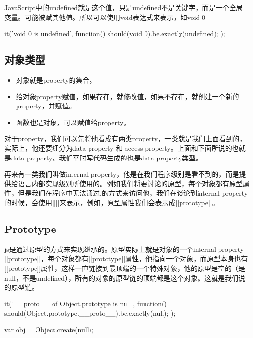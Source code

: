 JavaScript中的undefined就是这个值，只是undefined不是关键字，而是一个全局变量。可能被赋其他值。所以可以使用void表达式来表示，如void 0 
\begin{JavaScript}
		it('void 0 is undefined', function(){
			should(void 0).be.exactly(undefined);
		});
\end{JavaScript}

\subsection{对象类型}

\begin{itemize}
\item 对象就是property的集合。
\item 给对象property赋值，如果存在，就修改值，如果不存在，就创建一个新的property，并赋值。
\item 函数也是对象，可以赋值给property。
\end{itemize}
	
对于property，我们可以先将他看成有两类property，一类就是我们上面看到的，实际上，他还要细分为data property 和 access property。上面和下面所说的也就是data property。我们平时写代码生成的也是data property类型。
	
再来有一类我们叫做internal property，他是在我们程序级别是看不到的，而是提供给语言内部实现级别所使用的。例如我们将要讨论的原型，每个对象都有原型属性，但是我们在程序中无法通过.的方式来访问他，我们在谈论到internal property的时候，会使用[[]]来表示，例如，原型属性我们会表示成[[prototype]]。
	
\subsection{Prototype}
	
js是通过原型的方式来实现继承的。原型实际上就是对象的一个internal property [[prototype]]，每个对象都有[[prototype]]属性，他指向一个对象，而原型本身也有[[prototype]]属性，这样一直链接到最顶端的一个特殊对象，他的原型是空的（是null，不是undefined），所有的对象的原型链的顶端都是这个对象。这就是我们说的原型链。
\begin{JavaScript}[原型链的顶端是null]
		it('__proto__ of Object.prototype is null', function(){
			should(Object.prototype.__proto__).be.exactly(null);
		});
\end{JavaScript}

\begin{JavaScript}

var obj = Object.create(null);

\end{JavaScript}


